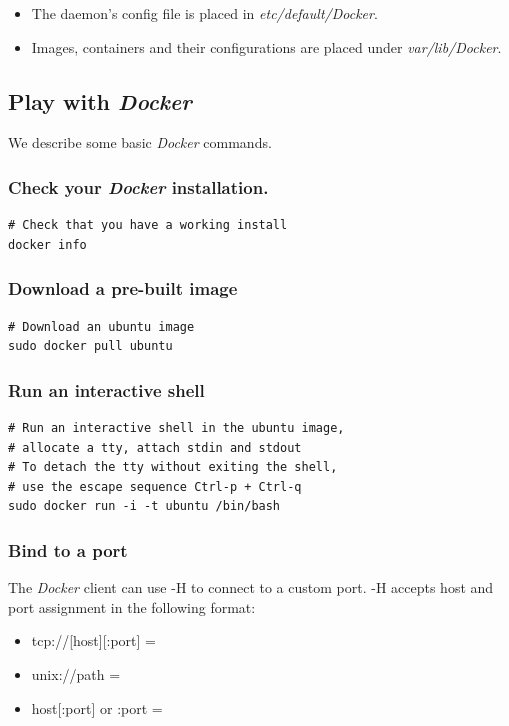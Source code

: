 \documentclass[captions=tableheading]{article}
\begin{document}
\begin{itemize}
\item The daemon's config file is placed in \emph{etc/default/Docker}.
\item Images, containers and their configurations are placed under \emph{var/lib/Docker}.
\end{itemize}
\subsection{Play with \emph{Docker}}
\label{sec-2-2}

We describe some basic \emph{Docker} commands.
\subsubsection{Check your \emph{Docker} installation.}
\label{sec-2-2-1}


\begin{verbatim}
# Check that you have a working install
docker info
\end{verbatim}
\subsubsection{Download a pre-built image}
\label{sec-2-2-2}


\begin{verbatim}
# Download an ubuntu image
sudo docker pull ubuntu
\end{verbatim}
\subsubsection{Run an interactive shell}
\label{sec-2-2-3}


\begin{verbatim}
# Run an interactive shell in the ubuntu image,
# allocate a tty, attach stdin and stdout
# To detach the tty without exiting the shell,
# use the escape sequence Ctrl-p + Ctrl-q
sudo docker run -i -t ubuntu /bin/bash
\end{verbatim}
\subsubsection{Bind to a port}
\label{sec-2-2-4}

The \emph{Docker} client can use -H to connect to a custom port.
-H accepts host and port assignment in the following format: 
\begin{itemize}
\item tcp://[host][:port]  =
\item unix://path =
\item host[:port] or :port =
\end{itemize}
\end{document}

